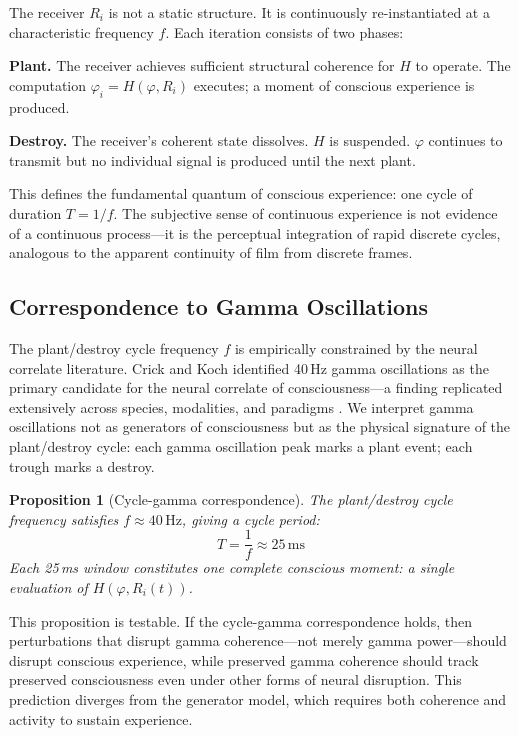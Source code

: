 \documentclass[12pt]{article}
\newtheorem{proposition}{Proposition}
\begin{document}
The receiver $R_i$ is not a static structure. It is continuously re-instantiated at a characteristic frequency $f$. Each iteration consists of two phases:

\textbf{Plant.} The receiver achieves sufficient structural coherence for $H$ to operate. The computation $\varphi_i = H(\varphi, R_i)$ executes; a moment of conscious experience is produced.

\textbf{Destroy.} The receiver's coherent state dissolves. $H$ is suspended. $\varphi$ continues to transmit but no individual signal is produced until the next plant.

This defines the fundamental quantum of conscious experience: one cycle of duration $T = 1/f$. The subjective sense of continuous experience is not evidence of a continuous process---it is the perceptual integration of rapid discrete cycles, analogous to the apparent continuity of film from discrete frames.

\subsection{Correspondence to Gamma Oscillations}

The plant/destroy cycle frequency $f$ is empirically constrained by the neural correlate literature. Crick and Koch \cite{crick1990} identified 40\,Hz gamma oscillations as the primary candidate for the neural correlate of consciousness---a finding replicated extensively across species, modalities, and paradigms \cite{engel2001}. We interpret gamma oscillations not as generators of consciousness but as the physical signature of the plant/destroy cycle: each gamma oscillation peak marks a plant event; each trough marks a destroy.

\begin{proposition}[Cycle-gamma correspondence]
The plant/destroy cycle frequency satisfies $f \approx 40\,\mathrm{Hz}$, giving a cycle period:
\begin{equation}
    T = \frac{1}{f} \approx 25\,\mathrm{ms}
\end{equation}
Each 25\,ms window constitutes one complete conscious moment: a single evaluation of $H(\varphi, R_i(t))$.
\end{proposition}

This proposition is testable. If the cycle-gamma correspondence holds, then perturbations that disrupt gamma coherence---not merely gamma power---should disrupt conscious experience, while preserved gamma coherence should track preserved consciousness even under other forms of neural disruption. This prediction diverges from the generator model, which requires both coherence and activity to sustain experience.
\end{document}
